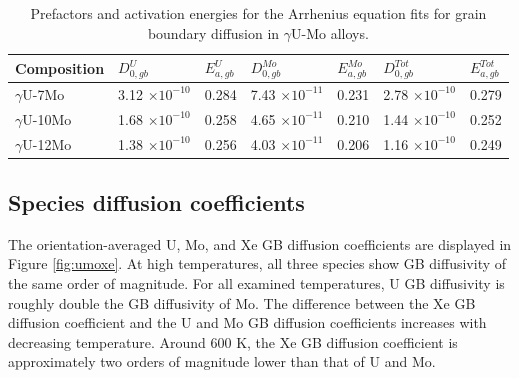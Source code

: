 \documentclass{elsarticle}
\begin{document}
\begin{table}[!ht]
\centering
\caption{Prefactors and activation energies for the Arrhenius equation fits for grain boundary diffusion in $\gamma$U-Mo alloys.}
\label{tab:compArr}
\begin{tabular}{lllllll}
\toprule
Composition & $D_{0,gb}^U$      & $E_{a,gb}^U$
	    & $D_{0,gb}^{Mo}$   & $E_{a,gb}^{Mo}$
	    & $D_{0,gb}^{Tot}$  & $E_{a,gb}^{Tot}$ \\
\midrule
$\gamma$U-7Mo  & 3.12 $\times 10^{-10}$ & 0.284 & 7.43 $\times 10^{-11}$
	       & 0.231 & 2.78 $\times 10^{-10}$ & 0.279  \\
$\gamma$U-10Mo & 1.68 $\times 10^{-10}$ & 0.258 & 4.65 $\times 10^{-11}$
	       & 0.210 & 1.44 $\times 10^{-10}$ & 0.252  \\
$\gamma$U-12Mo & 1.38 $\times 10^{-10}$ & 0.256 & 4.03 $\times 10^{-11}$
	       & 0.206 & 1.16 $\times 10^{-10}$ & 0.249  \\
\bottomrule
\end{tabular}
\end{table}


\FloatBarrier
\subsection{Species diffusion coefficients}

The orientation-averaged U, Mo, and Xe GB diffusion coefficients are displayed in Figure \ref{fig:umoxe}. At high temperatures, all three species show GB diffusivity of the same order of magnitude. For all examined temperatures, U GB diffusivity is roughly double the GB diffusivity of Mo. The difference between the Xe GB diffusion coefficient and the U and Mo GB diffusion coefficients increases with decreasing temperature. Around 600 K, the Xe GB diffusion coefficient is approximately two orders of magnitude lower than that of U and Mo.
\end{document}
